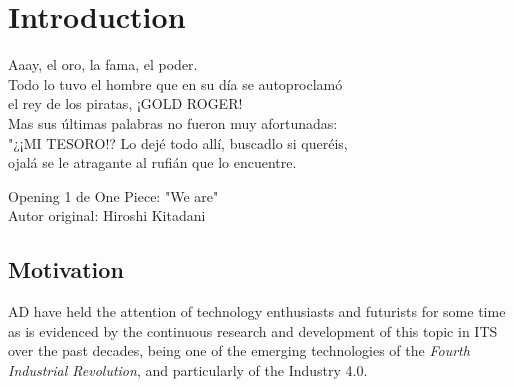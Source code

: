 % 
% 
% 
% 
% 
% 
% 

\chapter{Introduction}
\label{cha:introduction}

\begin{FraseCelebre}
  \begin{Frase}
    Aaay, el oro, la fama, el poder.  \\
    Todo lo tuvo el hombre que en su día se autoproclamó  \\
    el rey de los piratas, ¡GOLD ROGER!  \\
    Mas sus últimas palabras no fueron muy afortunadas:  \\
    "¿¡MI TESORO!? Lo dejé todo allí, buscadlo si queréis,  \\
    ojalá se le atragante al rufián que lo encuentre.
  \end{Frase}
  \begin{Fuente}
    Opening 1 de One Piece: "We are" \\
    Autor original: Hiroshi Kitadani
  \end{Fuente}
\end{FraseCelebre}

\section{Motivation}
\label{sec:1_motivation}

\ac{AD} have held the attention of technology enthusiasts and futurists for some time as is evidenced by the continuous research and development of this topic in \ac{ITS} over the past decades, being one of the emerging technologies of the \textit{Fourth Industrial Revolution}, and particularly of the Industry 4.0. 

